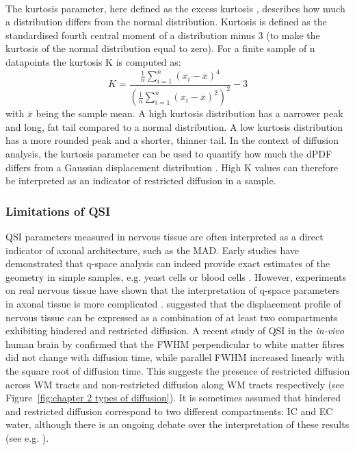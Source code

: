 \paragraph{}
The kurtosis parameter, here defined as the excess kurtosis \citep{Kenney:1957}, describes how much a distribution differs from the normal distribution. Kurtosis is defined as the standardised fourth central moment of a distribution minus 3 (to make the kurtosis of the normal distribution equal to zero). For a finite sample of n datapoints the kurtosis K is computed as:
\begin{equation}
	K=\frac{\tfrac{1}{n} \sum_{i=1}^n (x_i - \overline{x})^4}{\left(\tfrac{1}{n} \sum_{i=1}^n (x_i - \overline{x})^2\right)^2} - 3 
\end{equation}
with $\bar{x}$ being the sample mean. A high kurtosis distribution has a narrower peak and long, fat tail compared to a normal distribution. A low kurtosis distribution has a more rounded peak and a shorter, thinner tail. In the context of diffusion analysis, the kurtosis parameter can be used to quantify how much the \gls{dPDF} differs from a Gaussian displacement distribution \citep{Jensen:2010}. High K values can therefore be interpreted as an indicator of restricted diffusion in a sample.

\subsubsection{Limitations of QSI}
\Gls{QSI} parameters measured in nervous tissue are often interpreted as a direct indicator of axonal architecture, such as the \gls{MAD}.  Early studies have demonstrated that q-space analysis can indeed provide exact estimates of the geometry in simple samples, e.g. yeast cells \citep{Cory:1990} or blood cells \citep{Kuchel:1997}. However, experiments on real nervous tissue have shown that the interpretation of q-space parameters in axonal tissue is more complicated \citep{King:1994,Assaf:2000,Assaf:2000a,Bar-Shir:2008}. \citet{Assaf:2000} suggested that the displacement profile of nervous tissue can be expressed as a combination of at least two compartments exhibiting hindered and restricted diffusion. A recent study of QSI in the \emph{in-vivo} human brain by \citet{Nilsson:2009} confirmed that the FWHM perpendicular to white matter fibres did not change with diffusion time, while parallel FWHM increased linearly with the square root of diffusion time. This suggests the presence of restricted diffusion across \gls{WM} tracts and non-restricted diffusion along WM tracts respectively (see Figure~\ref{fig:chapter 2 types of diffusion}). It is sometimes assumed that hindered and restricted diffusion correspond to two different compartments: \gls{IC} and \gls{EC} water, although there is an ongoing debate over the interpretation of these results (see e.g. \citep{Kiselev:2007, Mulkern:2009}).


